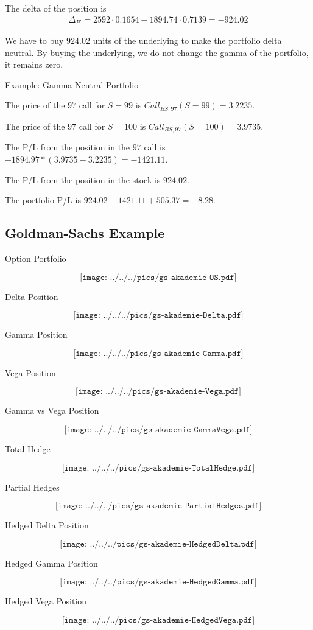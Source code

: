 	The delta of the position is
  \begin{align*}
    \Delta_{P'} = 2592 \cdot 0.1654 - 1894.74 \cdot 0.7139 = -924.02
  \end{align*}

	We have to buy $924.02$ units of the underlying to make the portfolio
  delta neutral. By buying the underlying, we do not change the gamma of the
  portfolio, it remains zero.


{Example: Gamma Neutral Portfolio}


	The price of the $97$ call for $S=99$ is $Call_{BS,97}(S=99)=3.2235$.

	The price of the $97$ call for $S=100$ is $Call_{BS,97}(S=100)=3.9735$.

	The P/L from the position in the $97$ call is
  $-1894.97*(3.9735-3.2235)=-1421.11$.

	The P/L from the position in the stock is $924.02$.

	The portfolio P/L is $924.02-1421.11+505.37=-8.28.$


\subsection{Goldman-Sachs Example}

{Option Portfolio}

$$\texttt{[image: ../../../pics/gs-akademie-OS.pdf]}$$

{Delta Position}

$$\texttt{[image: ../../../pics/gs-akademie-Delta.pdf]}$$

{Gamma Position}

$$\texttt{[image: ../../../pics/gs-akademie-Gamma.pdf]}$$

{Vega Position}

$$\texttt{[image: ../../../pics/gs-akademie-Vega.pdf]}$$

{Gamma vs Vega Position}

$$\texttt{[image: ../../../pics/gs-akademie-GammaVega.pdf]}$$

{Total Hedge}

$$\texttt{[image: ../../../pics/gs-akademie-TotalHedge.pdf]}$$

{Partial Hedges}

$$\texttt{[image: ../../../pics/gs-akademie-PartialHedges.pdf]}$$

{Hedged Delta Position}

$$\texttt{[image: ../../../pics/gs-akademie-HedgedDelta.pdf]}$$

{Hedged Gamma Position}

$$\texttt{[image: ../../../pics/gs-akademie-HedgedGamma.pdf]}$$

{Hedged Vega Position}

$$\texttt{[image: ../../../pics/gs-akademie-HedgedVega.pdf]}$$
